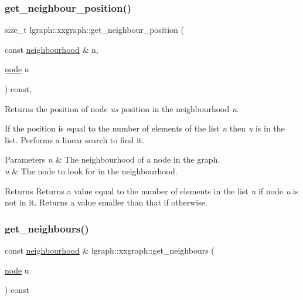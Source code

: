 \subsubsection{\texorpdfstring{get\+\_\+neighbour\+\_\+position()}{get\_neighbour\_position()}}
{\footnotesize\ttfamily size\+\_\+t lgraph\+::xxgraph\+::get\+\_\+neighbour\+\_\+position (\begin{DoxyParamCaption}\item[{const \hyperlink{namespacelgraph_a052e7766c13f3a43cec0aec8173fdede}{neighbourhood} \&}]{n,  }\item[{\hyperlink{namespacelgraph_a397169dd66adf725210a30fb7251773e}{node}}]{u }\end{DoxyParamCaption}) const\hspace{0.3cm}{\ttfamily [protected]}, {\ttfamily [inherited]}}



Returns the position of node {\itshape u\textquotesingle{}s} position in the neighbourhood {\itshape n}. 

If the position is equal to the number of elements of the list {\itshape n} then {\itshape u} is in the list. Performs a linear search to find it.


\begin{DoxyParams}{Parameters}
{\em n} & The neighbourhood of a node in the graph. \\
\hline
{\em u} & The node to look for in the neighbourhood. \\
\hline
\end{DoxyParams}
\begin{DoxyReturn}{Returns}
Returns a value equal to the number of elements in the list {\itshape n} if node {\itshape u} is not in it. Returns a value smaller than that if otherwise. 
\end{DoxyReturn}
\mbox{\label{classlgraph_1_1xxgraph_a745a535506115c66ce0993ef7e7759ba}} 
\subsubsection{\texorpdfstring{get\+\_\+neighbours()}{get\_neighbours()}}
{\footnotesize\ttfamily const \hyperlink{namespacelgraph_a052e7766c13f3a43cec0aec8173fdede}{neighbourhood} \& lgraph\+::xxgraph\+::get\+\_\+neighbours (\begin{DoxyParamCaption}\item[{\hyperlink{namespacelgraph_a397169dd66adf725210a30fb7251773e}{node}}]{u }\end{DoxyParamCaption}) const\hspace{0.3cm}{\ttfamily [inherited]}}



